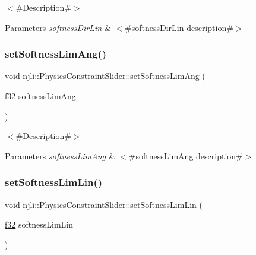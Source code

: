 $<$\#\+Description\#$>$


\begin{DoxyParams}{Parameters}
{\em softness\+Dir\+Lin} & $<$\#softness\+Dir\+Lin description\#$>$ \\
\hline
\end{DoxyParams}
\mbox{\label{classnjli_1_1_physics_constraint_slider_acd70aaf79937089b08b6ef30c8560761}} 
\subsubsection{\texorpdfstring{set\+Softness\+Lim\+Ang()}{setSoftnessLimAng()}}
{\footnotesize\ttfamily \mbox{\hyperlink{_thread_8h_af1e856da2e658414cb2456cb6f7ebc66}{void}} njli\+::\+Physics\+Constraint\+Slider\+::set\+Softness\+Lim\+Ang (\begin{DoxyParamCaption}\item[{\mbox{\hyperlink{_util_8h_a5f6906312a689f27d70e9d086649d3fd}{f32}}}]{softness\+Lim\+Ang }\end{DoxyParamCaption})}

$<$\#\+Description\#$>$


\begin{DoxyParams}{Parameters}
{\em softness\+Lim\+Ang} & $<$\#softness\+Lim\+Ang description\#$>$ \\
\hline
\end{DoxyParams}
\mbox{\label{classnjli_1_1_physics_constraint_slider_af8944672819807ff34698dd9ca71fa8c}} 
\subsubsection{\texorpdfstring{set\+Softness\+Lim\+Lin()}{setSoftnessLimLin()}}
{\footnotesize\ttfamily \mbox{\hyperlink{_thread_8h_af1e856da2e658414cb2456cb6f7ebc66}{void}} njli\+::\+Physics\+Constraint\+Slider\+::set\+Softness\+Lim\+Lin (\begin{DoxyParamCaption}\item[{\mbox{\hyperlink{_util_8h_a5f6906312a689f27d70e9d086649d3fd}{f32}}}]{softness\+Lim\+Lin }\end{DoxyParamCaption})}

